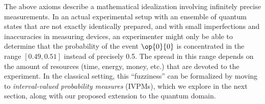 \documentclass[english,reprint, aps, prl,superscriptaddress, showpacs,
showkeys, longbibliography, amsmath, amssymb, floatfix]{revtex4-1}
\theoremstyle{plain}
\theoremstyle{definition}
\newcommand{\proj}[1]{\op{#1}{#1}}
\newcommand{\ps}{\texttt{+}}
\newcommand{\rmi}{\mathrm{i}}
\begin{document}
\begin{comment}
As an example, consider a three-dimensional Hilbert space with orthonormal
basis $\{\ket{0},\ket{1},\ket{2}\}$ and an observable $\mathbf{O}$
with spectral decomposition $\mathbf{O}=\proj{0}+2\,\proj{1}+3\,\proj{2}$,
i.e., $\lambda_{i}=i$ and $P_{i}=\proj{i-1}$. Two fragments of valid
probability measures~$\mu_{1}$ and $\mu_{2}$ that can be associated
with this space are defined in Table~\ref{tab:quantum-probability-measure}.
\begin{table}
\noindent \centering{}\caption{\label{tab:quantum-probability-measure}Two fragments of valid probability
measures~$\mu_{1}$ and $\mu_{2}$.}
\begin{tabular}{ccc}
\toprule 
\addlinespace
$\ket{\psi}$ & $\mu_{1}(\proj{\psi})$ & $\mu_{2}(\proj{\psi})$\tabularnewline\addlinespace
\midrule
\midrule 
\addlinespace
$\ket{0}$ & $\frac{1}{2}$ & $\frac{1}{2}$\tabularnewline\addlinespace
\midrule 
\addlinespace
$\ket{1}$ & $\frac{1}{2}$ & $0$\tabularnewline\addlinespace
\midrule 
\addlinespace
$\ket{2}$ & $0$ & $\frac{1}{2}$\tabularnewline\addlinespace
\midrule 
\addlinespace
$\ket{\ps}=\frac{\ket{0}+\ket{1}}{\sqrt{2}}$ & $1$ & $\frac{1}{4}$\tabularnewline\addlinespace
\midrule 
\addlinespace
$\ket{\rmi}=\frac{\ket{0}+\rmi\ket{1}}{\sqrt{2}}$ & $\frac{1}{2}$ & $\frac{1}{4}$\tabularnewline\addlinespace
\midrule 
\addlinespace
$\ket{\ps'}=\frac{\ket{0}+\ket{2}}{\sqrt{2}}$ & $\frac{1}{4}$ & $\frac{1}{2}$\tabularnewline\addlinespace
\midrule 
\addlinespace
$\ket{\rmi'}=\frac{\ket{0}+\rmi\ket{2}}{\sqrt{2}}$ & $\frac{1}{4}$ & $\frac{1}{2}$\tabularnewline\addlinespace
\midrule 
\addlinespace
$\ket{\ps''}=\frac{\ket{1}+\ket{2}}{\sqrt{2}}$ & $\frac{1}{4}$ & $\frac{1}{4}$\tabularnewline\addlinespace
\midrule 
\addlinespace
$\ket{\rmi''}=\frac{\ket{1}+\rmi\ket{2}}{\sqrt{2}}$ & $\frac{1}{4}$ & $\frac{1}{4}$\tabularnewline\addlinespace
\bottomrule
\end{tabular}
\end{table}
By the Born rule, the first probability measure corresponds to the
quantum system being in the pure state $\ket{\ps}=(\ket{0}+\ket{1})/\sqrt{2}$
and the second corresponds to the quantum system being in the state
$\rho=(\proj{0}+\proj{2})/2$. The expectation values of the observable
$\mathbf{O}$, $\expval{\mathbf{O}}_{\mu_{1,2}}$, are 1.5 in the
first case and 2 in the second.
\end{comment}

The above axioms describe a mathematical idealization involving
infinitely precise measurements. In an actual experimental setup with
an ensemble of quantum states that are not exactly identically
prepared, and with small imperfections and inaccuracies in measuring
devices, an experimenter might only be able to determine that the
probability of the event $\proj{0}$ is concentrated in the range $[0.49,0.51]$
instead of precisely 0.5. The spread in this range depends on the
amount of resources (time, energy, money, etc.) that are devoted to
the experiment. In the classical setting, this ``fuzziness'' can be
formalized by moving to \emph{interval-valued probability measures}
(IVPMs), which we explore in the next section, along with our proposed
extension to the quantum domain.
\end{document}

